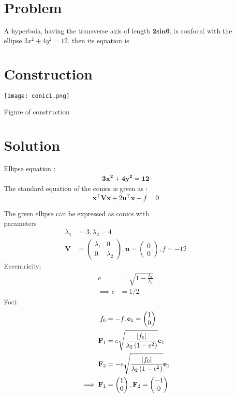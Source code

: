\documentclass[10pt, a4paper]{article}
\title{\mytitle}
\author{\myauthor\hspace{1em}\\\contact\\FWC22098\hspace{6.5em}IITH\hspace{0.5em}\mymodule\hspace{6em}Assignment- Conics}
\providecommand{\brak}[1]{\ensuremath{\left(#1\right)}}
\newcommand{\myvec}[1]{\ensuremath{\begin{pmatrix}#1\end{pmatrix}}}
\let\vec\mathbf
\begin{document}
	\maketitle
	\tableofcontents
   \section{Problem}
  A hyperbola, having the transverse axis of length $\vec{2sin\theta}$, is confocal with the ellipse $3x^2+4y^2=12$, then its equation is
   \section{Construction}
  \texttt{[image: conic1.png]}
  	\begin{center}
  Figure of construction
  	\end{center}
  \section{Solution}

Ellipse equation : \begin{align}
\vec{3x^2}+\vec{4y^2}=\vec{12}
  \end{align}
The standard equation of the conics is given as :
\begin{align}
\vec{x}^{\top}\vec{V}\vec{x}+2\vec{u}^{\top}\vec{x}+f=0
\end{align}

The given ellipse can be expressed as conics with \\parameters
\begin{align}
	\lambda_1&=3,\lambda_2=4 \\ \vec{V} &= \myvec{	\lambda_1& 0 \\
			          0 & \lambda_2}  
		    , \vec{u} = \myvec{0 \\0}, f = -12
	\end{align}
	Eccentricity:
	\begin{align}
	 e&=\sqrt{1-\frac{\lambda_1}{\lambda_2}}\\
	 \implies e&=1/2
	 \end{align}
	 Foci:
	 \begin{align}
	 f_0&=-f,\vec{e}_1 = \myvec{1 \\0}\\
	 	 \vec{F}_1&=  e\sqrt{\frac{\abs{f_0}}{\lambda_2\brak{1-e^2}}}\vec{e}_1\\
	 	 \vec{F}_2&= - e\sqrt{\frac{\abs{f_0}}{\lambda_2\brak{1-e^2}}}\vec{e}_1\\
	 \implies \vec{F}_1&=\myvec{1\\0},\vec{F}_2=\myvec{-1\\0}
	 \end{align}
	 
\end{document}
